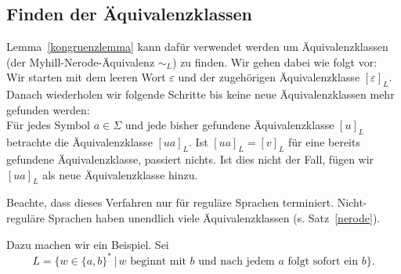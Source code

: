 \documentclass[11pt, a4paper]{article}
\theoremstyle{definition}
\theoremstyle{plain}
\begin{document}
\subsection*{Finden der Äquivalenzklassen}
Lemma~\ref{kongruenzlemma} kann dafür verwendet werden um Äquivalenzklassen (der Myhill-Nerode-Äquivalenz \( \sim_L \)) zu finden. Wir gehen dabei wie folgt vor:\\
Wir starten mit dem leeren Wort \( \varepsilon \) und der zugehörigen Äquivalenzklasse \( [\varepsilon]_L \). Danach wiederholen wir folgende Schritte bis keine neue Äquivalenzklassen mehr gefunden werden:\\
Für jedes Symbol \( a \in \Sigma \) und jede bisher gefundene Äquivalenzklasse \( [u]_L \) betrachte die Äquivalenzklasse \( [ua]_L \). Ist \( [ua]_L = [v]_L \) für eine bereits gefundene Äquivalenzklasse, passiert nichts. Ist dies nicht der Fall, fügen wir \( [ua]_L \) als neue Äquivalenzklasse hinzu.\par
Beachte, dass dieses Verfahren nur für reguläre Sprachen terminiert. Nicht-reguläre Sprachen haben unendlich viele Äquivalenzklassen (s. Satz~\ref{nerode}).\par
Dazu machen wir ein Beispiel. Sei 
\[
	L = \{ w \in \{ a, b \}^\ast \,\vert\, w \text{ beginnt mit } b \text{ und nach jedem } a \text{ folgt sofort ein } b \}.
\]
\end{document}
